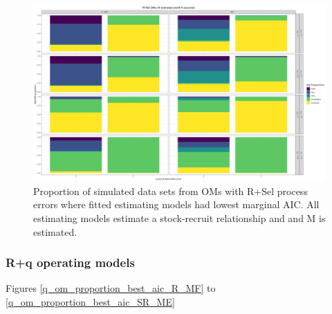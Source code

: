 \documentclass[
  12pt,
]{article}
\begin{document}
\begin{landscape}
\begin{figure}
\caption{Proportion of simulated data sets from OMs with R+Sel process errors where fitted estimating models had lowest marginal AIC. All estimating models estimate a stock-recruit relationship and and M is estimated.} \label{Sel_om_proportion_best_aic_SR_ME}
\begin{center}
\includegraphics[width = \textwidth]{Sel_om_proportion_best_aic_SR_ME.png}
\end{center}
\end{figure}
\end{landscape}

\hypertarget{rq-operating-models-1}{%
\subsubsection*{R+q operating models}\label{rq-operating-models-1}}

Figures \ref{q_om_proportion_best_aic_R_MF} to
\ref{q_om_proportion_best_aic_SR_ME}
\end{document}
